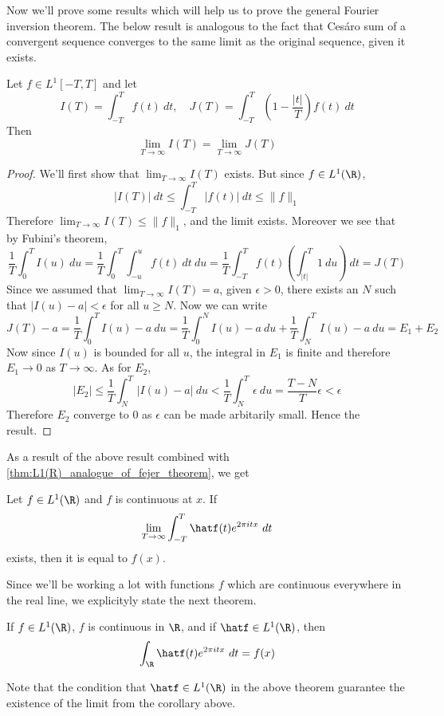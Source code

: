 Now we'll prove some results which will help us to prove the general Fourier inversion theorem. The below result is analogous to the fact that Ces\'aro sum of a convergent sequence converges to the same limit as the original sequence, given it exists.
\begin{proposition}
  \label{prop:cesaro_integral_converge_to_same_limit}
  Let $f \in L^1[-T, T]$ and let $$I(T) = \int_{-T}^T f(t) \ dt, \quad J(T) = \int_{-T}^T\left(1-\frac{|t|}{T}\right)f(t)\ dt$$
  Then $$\lim_{T\to \infty} I(T) = \lim_{T\to \infty}J(T)$$
\end{proposition}
\begin{proof}
  We'll first show that $\lim_{T\to \infty}I(T)$ exists. But since $f\in L^1(\R)$, $$|I(T)| \ dt \le \int_{-T}^T |f(t)| \ dt \le \|f\|_1$$
  Therefore $\lim_{T \to \infty}I(T) \le \|f\|_1$, and the limit exists. Moreover we see that by Fubini's theorem, $$\frac{1}{T} \int_0^T I(u) \ du = \frac{1}{T} \int_0^T\int_{-u}^u f(t) \ dt \ du = \frac{1}{T}\int_{-T}^T f(t) \left(\int_{|t|}^T 1 \ du \right) \ dt = J(T)$$
  Since we assumed that $\lim_{T\to \infty} I(T) = a$, given $\epsilon > 0$, there exists an $N$ such that $|I(u) - a| < \epsilon$ for all $u \ge N$. Now we can write $$J(T) - a = \frac{1}{T}\int_0^T I(u) - a \ du = \frac{1}{T}\int_0^N I(u) - a \ du + \frac{1}{T}\int_N^T I(u) - a \ du = E_1 + E_2$$
  Now since $I(u)$ is bounded for all $u$, the integral in $E_1$ is finite and therefore $E_1 \to 0$ as $T\to \infty$. As for $E_2$, $$|E_2| \le \frac{1}{T} \int_N^T |I(u) -a| \ du < \frac{1}{T}\int_N^T \epsilon \ du = \frac{T-N}{T}\epsilon < \epsilon$$
  Therefore $E_2$ converge to 0 as $\epsilon$ can be made arbitarily small. Hence the result. %
\end{proof}

As a result of the above result combined with \autoref{thm:L1(R)_analogue_of_fejer_theorem}, we get
\begin{corollary}
  \label{cor:fourier_inversion_equals_f_at_points_of_continuity}
  Let $f\in L^1(\R)$ and $f$ is continuous at $x$. If $$\lim_{T\to \infty} \int_{-T}^T\hatf(t)e^{2\pi itx} \ dt$$
  exists, then it is equal to $f(x)$.
\end{corollary}

Since we'll be working a lot with functions $f$ which are continuous everywhere in the real line, we explicityly state the next theorem.
\begin{theorem}
  If $f\in L^1(\R)$, $f$ is continuous in $\R$, and if $\hatf \in L^1(\R)$, then $$\int_\R \hatf(t)e^{2\pi itx} \ dt = f(x)$$
\end{theorem}
Note that the condition that $\hatf \in L^1(\R)$ in the above theorem guarantee the existence of the limit from the corollary above.

